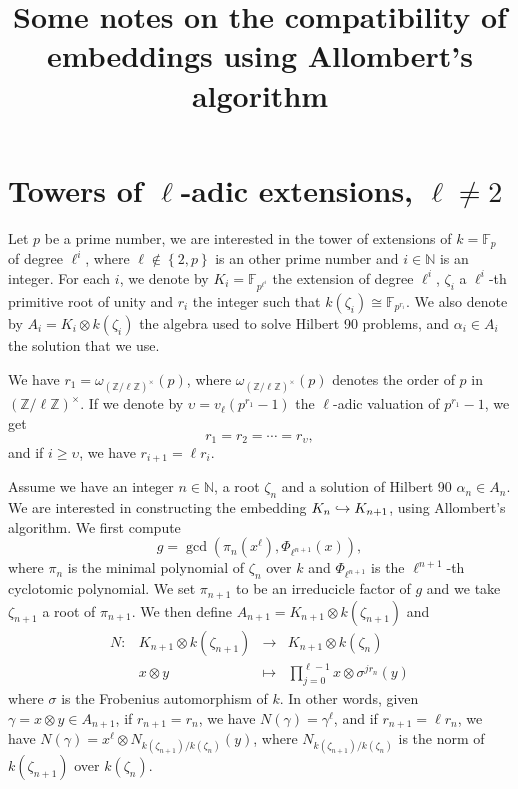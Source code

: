 \documentclass[a4paper,11pt]{article}
\title{Some notes on the compatibility of embeddings using Allombert's algorithm}
\author{}
\begin{document}
\maketitle





\section{Towers of $\ell$-adic extensions, $\ell\neq2$}

Let $p$ be a prime number, we are interested in the tower of extensions of
$k=\mathbb{F}_p$ of degree $\ell^i$, where $\ell\notin\left\{ 2, p
\right\}$ is an other prime
number and $i\in\mathbb{N}$ is an integer. For each $i$, we denote by
$K_i=\mathbb{F}_{p^{\ell^i}}$ the extension of degree $\ell^i$, $\zeta_i$ a
$\ell^i$-th primitive root of unity and $r_i$ the integer such that
$k(\zeta_i)\cong\mathbb{F}_{p^{r_i}}$. We also denote by $A_i=K_i\otimes
k(\zeta_i)$ the algebra used to solve Hilbert 90 problems, and $\alpha_i\in A_i$ the
solution that we use.

We have $r_1=\omega_{(\mathbb{Z}/\ell\mathbb{Z})^\times}(p)$, where
$\omega_{(\mathbb{Z}/\ell\mathbb{Z})^\times}(p)$ denotes the order of $p$ in
$(\mathbb{Z}/\ell\mathbb{Z})^\times$. If we denote by $\upsilon=v_\ell(p^{r_1}-1)$
the $\ell$-adic valuation of $p^{r_1}-1$, we get 
\[
  r_1 = r_2 = \cdots = r_{\upsilon},
\]
and if $i\geq\upsilon$, we have $r_{i+1}=\ell r_i$.

Assume we have an integer $n\in\mathbb{N}$, a root
$\zeta_n$ and a solution of Hilbert 90 $\alpha_n\in A_n$. We are interested in
constructing the embedding $K_n\hookrightarrow K_{n+1}$, using Allombert's algorithm. We
first compute 
\[
  g = \gcd(\pi_n(x^\ell), \Phi_{\ell^{n+1}}(x)),
\]
where $\pi_n$ is the minimal polynomial of $\zeta_n$ over $k$ and
$\Phi_{\ell^{n+1}}$ is the $\ell^{n+1}$-th cyclotomic polynomial. We set
$\pi_{n+1}$ to be an irreducicle factor of $g$ and we take $\zeta_{n+1}$ a root
of $\pi_{n+1}$. We then define $A_{n+1}=K_{n+1}\otimes k(\zeta_{n+1})$ and
\[
\begin{array}{cccc}
  N: & K_{n+1}\otimes k(\zeta_{n+1}) & \to & K_{n+1}\otimes k(\zeta_n) \\
  & x\otimes y & \mapsto & \prod_{j=0}^{\ell-1} x \otimes \sigma^{jr_n}(y)
\end{array}
\]
where $\sigma$ is the Frobenius automorphism of $k$. In other words, given
$\gamma=x\otimes y\in A_{n+1}$, if $r_{n+1}=r_n$, we have $N(\gamma) =
\gamma^\ell$, and if $r_{n+1}=\ell r_n$, we have $N(\gamma) = x^\ell\otimes
N_{k(\zeta_{n+1})/k(\zeta_n)}(y)$, where $N_{k(\zeta_{n+1})/k(\zeta_n)}$ is the
norm of $k(\zeta_{n+1})$ over $k(\zeta_n)$. 
\end{document}
